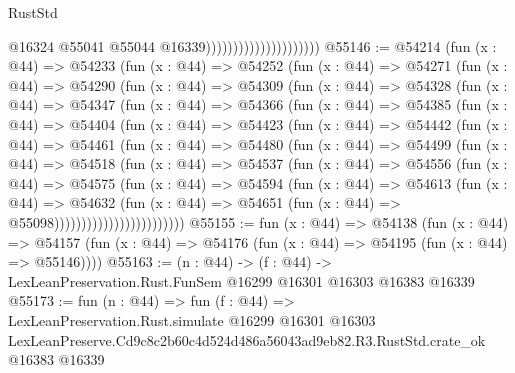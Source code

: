 \begin{lexlean}{RustStd}
\begin{coremodule}
                                              @16324
                                              @55041
                                              @55044
                                              @16339)))))))))))))))))))))
@55146 := @54214
    (fun (x : @44) =>
    @54233
      (fun (x : @44) =>
      @54252
        (fun (x : @44) =>
        @54271
          (fun (x : @44) =>
          @54290
            (fun (x : @44) =>
            @54309
              (fun (x : @44) =>
              @54328
                (fun (x : @44) =>
                @54347
                  (fun (x : @44) =>
                  @54366
                    (fun (x : @44) =>
                    @54385
                      (fun (x : @44) =>
                      @54404
                        (fun (x : @44) =>
                        @54423
                          (fun (x : @44) =>
                          @54442
                            (fun (x : @44) =>
                            @54461
                              (fun (x : @44) =>
                              @54480
                                (fun (x : @44) =>
                                @54499
                                  (fun (x : @44) =>
                                  @54518
                                    (fun (x : @44) =>
                                    @54537
                                      (fun (x : @44) =>
                                      @54556
                                        (fun (x : @44) =>
                                        @54575
                                          (fun (x : @44) =>
                                          @54594
                                            (fun (x : @44) =>
                                            @54613
                                              (fun (x : @44) =>
                                              @54632
                                                (fun (x : @44) =>
                                                @54651
                                                  (fun (x : @44) => @55098))))))))))))))))))))))))
@55155 := fun (x : @44) =>
  @54138
    (fun (x : @44) =>
    @54157 (fun (x : @44) => @54176 (fun (x : @44) => @54195 (fun (x : @44) => @55146))))
@55163 := (n : @44) ->
  (f : @44) -> LexLeanPreservation.Rust.FunSem @16299 @16301 @16303 @16383 @16339
@55173 := fun (n : @44) =>
  fun (f : @44) =>
  LexLeanPreservation.Rust.simulate
    @16299
    @16301
    @16303
    LexLeanPreserve.Cd9c8c2b60c4d524d486a56043ad9eb82.R3.RustStd.crate_ok
    @16383
    @16339
\end{coremodule}
\end{lexlean}
